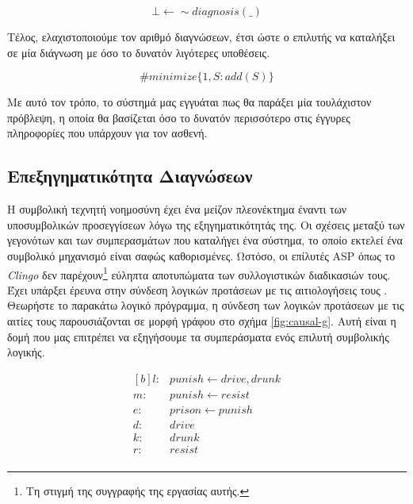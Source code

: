 \documentclass[12pt]{extarticle}
\begin{document}
\begin{equation}
    \bot \longleftarrow \sim diagnosis(\_)
\end{equation}

Τέλος, ελαχιστοποιούμε τον αριθμό  διαγνώσεων, έτσι ώστε ο επιλυτής 
να καταλήξει σε μία διάγνωση με όσο το δυνατόν λιγότερες υποθέσεις.

\begin{equation}
    \#minimize \{ 1, S : add(S) \}
\end{equation}

Με αυτό τον τρόπο, το σύστημά μας εγγυάται πως θα παράξει μία τουλάχιστον πρόβλεψη, η οποία 
θα βασίζεται όσο το δυνατόν περισσότερο στις έγγυρες πληροφορίες που υπάρχουν για τον ασθενή.

\subsection{Επεξηγηματικότητα Διαγνώσεων}

Η συμβολική τεχνητή νοημοσύνη έχει ένα μείζον πλεονέκτημα έναντι των υποσυμβολικών προσεγγίσεων λόγω της εξηγηματικότητάς της.
Οι σχέσεις μεταξύ των γεγονότων και των συμπερασμάτων που καταλήγει ένα σύστημα, το οποίο εκτελεί ένα συμβολικό μηχανισμό είναι σαφώς καθορισμένες.
Ωστόσο, οι επίλυτές ASP όπως το \textit{Clingo} δεν παρέχουν\footnote{Τη στιγμή της συγγραφής της εργασίας αυτής.} εύληπτα αποτυπώματα των συλλογιστικών διαδικασιών τους.
Έχει υπάρξει έρευνα στην σύνδεση λογικών προτάσεων 
με τις αιτιολογήσεις τους \cite{cabalar2014causal}.
Θεωρήστε το παρακάτω λογικό πρόγραμμα, η σύνδεση των λογικών προτάσεων με τις αιτίες τους παρουσιάζονται 
σε μορφή γράφου στο σχήμα \ref{fig:causal-g}. Αυτή είναι η δομή που μας επιτρέπει 
να εξηγήσουμε τα συμπεράσματα ενός επιλυτή συμβολικής λογικής.

\begin{equation}
\begin{aligned}[b]
    l :& punish \longleftarrow drive, drunk \\
    m :& punish \longleftarrow resist \\
    e :& prison \longleftarrow punish \\
    d :& drive \\
    k :& drunk \\
    r :& resist \\
\end{aligned}
\label{eq:example-cg}
\end{equation}
\end{document}
